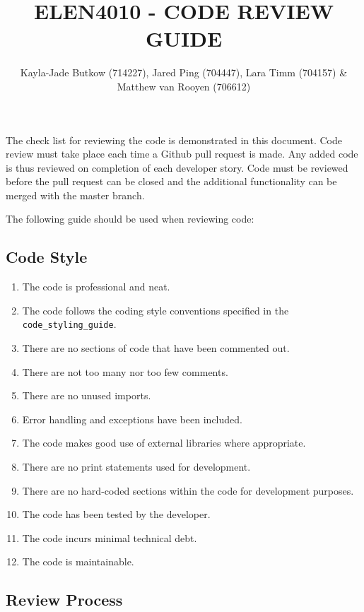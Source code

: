 \documentclass[10pt,onecolumn]{witseiepaper}
\title{ELEN4010 - CODE REVIEW GUIDE}
\author{Kayla-Jade Butkow (714227), Jared Ping (704447), Lara Timm (704157) \& Matthew van Rooyen (706612)}
\begin{document}
\maketitle
\pagestyle{plain}
\setcounter{page}{1}

The check list for reviewing the code is demonstrated in this document. Code review must take place each time a Github pull request is made. Any added code is thus reviewed on completion of each developer story. Code must be reviewed before the pull request can be closed and the additional functionality can be merged with the master branch.

The following guide should be used when reviewing code:

\vspace{3mm}
\subsection*{\textbf{Code Style}}

\begin{enumerate}
	\item The code is professional and neat.
	\item The code follows the coding style conventions specified in the \texttt{code\_styling\_guide}.
	\item There are no sections of code that have been commented out.
	\item There are not too many nor too few comments.
	\item There are no unused imports.
	\item Error handling and exceptions have been included.
	\item The code makes good use of external libraries where appropriate.
	\item There are no print statements used for development.
	\item There are no hard-coded sections within the code for development purposes.
	\item The code has been tested by the developer.
	\item The code incurs minimal technical debt.
	\item The code is maintainable.
	
\end{enumerate}

\vspace{3mm}
\subsection*{\textbf{Review Process}}
\end{document}

